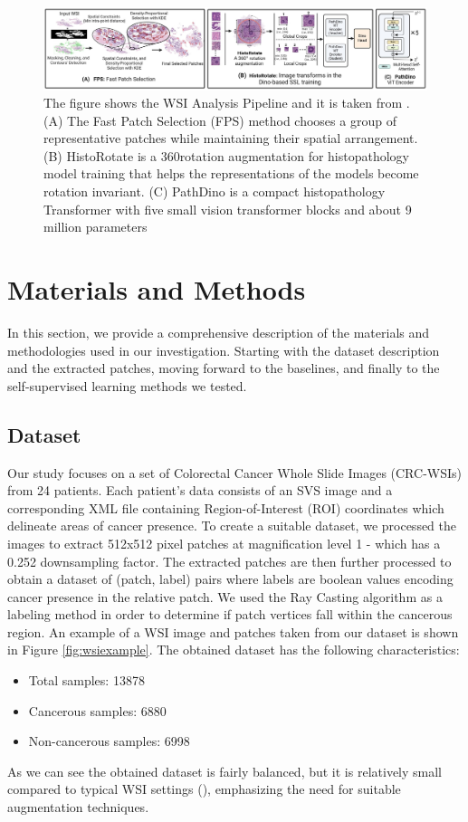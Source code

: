 \documentclass[peerreview]{IEEEtran}
\begin{document}
\begin{figure}
\centering
\includegraphics[width=\textwidth]{figure/PathDino2.jpg} 
\caption[The WSI Analysis Pipeline]{\small The figure shows the WSI Analysis Pipeline and it is taken from \cite{pathdino}. (A) The Fast Patch Selection (FPS) method chooses a group of representative patches while maintaining their spatial arrangement. (B) HistoRotate is a 360\textdegree rotation augmentation for histopathology model training that helps the representations of the models become rotation invariant. (C) PathDino is a compact histopathology Transformer with five small vision transformer blocks and about 9 million parameters}
\label{fig:PathDino}
\end{figure}


\section{Materials and Methods}
\label{sec:methods}
In this section, we provide a comprehensive description of the materials and methodologies used in our investigation. Starting with the dataset description and the extracted patches, moving forward to the baselines, and finally to the self-supervised learning methods we tested.

\subsection{Dataset}
Our study focuses on a set of Colorectal Cancer Whole Slide Images (CRC-WSIs) from 24 patients. Each patient's data consists of an SVS image and a corresponding XML file containing Region-of-Interest (ROI) coordinates which delineate areas of cancer presence. To create a suitable dataset, we processed the images to extract 512x512 pixel patches at magnification level 1 - which has a 0.252 downsampling factor. The extracted patches are then further processed to obtain a dataset of (patch, label) pairs where labels are boolean values encoding cancer presence in the relative patch. We used the Ray Casting algorithm as a labeling method in order to determine if patch vertices fall within the cancerous region. An example of a WSI image and patches taken from our dataset is shown in Figure \ref{fig:wsiexample}.
The obtained dataset has the following characteristics:
\begin{itemize}
    \item Total samples: 13878
    \item Cancerous samples: 6880
    \item Non-cancerous samples: 6998
\end{itemize} As we can see the obtained dataset is fairly balanced, but it is relatively small compared to typical WSI settings (\cite{ehteshami2017diagnostic
}), emphasizing the need for suitable augmentation techniques.
\end{document}
